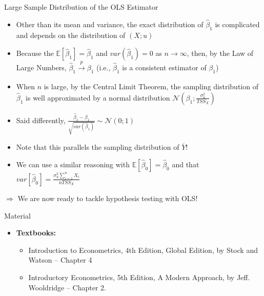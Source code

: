 \documentclass[notes,10pt, aspectratio=169]{beamer}
\begin{document}
\begin{frame}{Large Sample Distribution of the OLS Estimator}
\begin{itemize}
    \item Other than its mean and variance, the exact distribution of $\hat{\beta}_1$ is complicated and depends on the distribution of $(X; u)$
    \item Because the $\mathbb{E}[\hat{\beta}_1] = \hat{\beta}_1$ and $var(\hat{\beta}_1)=0$ as $n\rightarrow \infty$, then, by the Law of Large Numbers, $\hat{\beta}_1 \xrightarrow[]{p} \beta_1$ (i.e., $\hat{\beta}_1$ is a consistent estimator of $\beta_1$)
    \item When $n$ is large, by the Central Limit Theorem, the sampling distribution of $\hat{\beta}_1$ is well approximated by a normal distribution $\mathcal{N}(\beta_1; \frac{\sigma^2_u}{TSS_X})$
    \item Said differently, $\frac{\hat{\beta}_1-\beta_1}{\sqrt{var(\hat{\beta}_1)}}\sim \mathcal{N}(0;1)$
    \item Note that this parallels the sampling distribution of $\overline{Y}!$
    \item We can use a similar reasoning with $\mathbb{E}[\hat{\beta}_0] = \hat{\beta}_0$ and that $var[\hat{\beta}_0] = \frac{\sigma^2_u \sum_{i=1}^n X_i}{n TSS_X}$
\end{itemize}\vspace{1cm}
$\Rightarrow$ We are now ready to tackle hypothesis testing with OLS!
\end{frame}



\begin{frame}[allowframebreaks]{Material}
\begin{itemize}
    \item[--] \textbf{Textbooks:}
    \begin{itemize}
        \item Introduction to Econometrics, 4th Edition, Global Edition, by Stock and Watson -- Chapter 4
        \item Introductory Econometrics, 5th Edition, A Modern Approach, by Jeff. Wooldridge -- Chapter 2.
    \end{itemize}
\end{itemize}
\scriptsize{

 
}
\end{frame}
\end{document}
